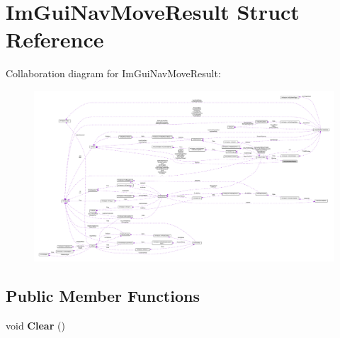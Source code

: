 \hypertarget{structImGuiNavMoveResult}{}\section{Im\+Gui\+Nav\+Move\+Result Struct Reference}
\label{structImGuiNavMoveResult}


Collaboration diagram for Im\+Gui\+Nav\+Move\+Result\+:\nopagebreak
\begin{figure}[H]
\begin{center}
\leavevmode
\includegraphics[width=350pt]{structImGuiNavMoveResult__coll__graph}
\end{center}
\end{figure}
\subsection*{Public Member Functions}
\begin{DoxyCompactItemize}
\item 
\mbox{\label{structImGuiNavMoveResult_a5a357bf3bc46689eebec0f6dfdfd51ca}} 
void {\bfseries Clear} ()
\end{DoxyCompactItemize}
